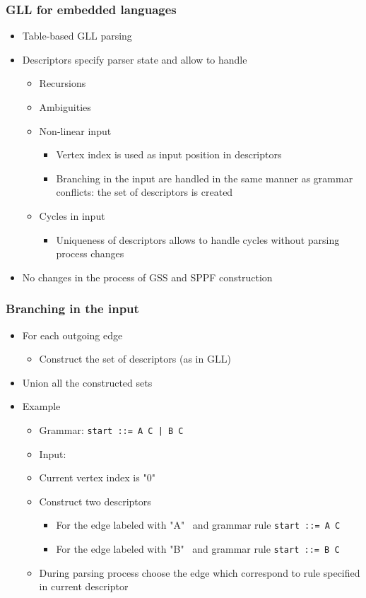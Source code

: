 \documentclass{beamer}
\begin{document}
\begin{frame}
  \transwipe[direction=90]
  \frametitle{GLL for embedded languages}  
  \begin{itemize}
    \item Table-based GLL parsing
    \item Descriptors specify parser state and allow to handle    
  \begin{itemize}
    \item Recursions
    \item Ambiguities
    \item Non-linear input
      \begin{itemize}
        \item Vertex index is used as input position in descriptors
        \item Branching in the input are handled in the same manner as grammar conflicts: the set of descriptors is created
      \end{itemize}
    \item Cycles in input
      \begin{itemize}
        \item Uniqueness of descriptors allows to handle cycles without parsing process changes
      \end{itemize}
    \end{itemize}
    \item  No changes in the process of GSS and SPPF construction
  \end{itemize}
\end{frame}

\begin{frame}
  \transwipe[direction=90]
  \frametitle{Branching in the input}
  \begin{itemize}
    \item For each outgoing edge
    \begin{itemize}
      \item Construct the set of descriptors (as in GLL)
    \end{itemize}
    \item Union all the constructed sets
    \item Example
    \begin{itemize}
      \item Grammar: \texttt{start ::= A C | B C}
      \item Input:
      \item Current vertex index is "0"
      \item Construct two descriptors
      \begin{itemize}
          \item For the edge labeled with "A" \ and grammar rule \texttt{start ::= A C}
          \item For the edge labeled with "B" \ and grammar rule \texttt{start ::= B C}
      \end{itemize}
      \item During parsing process choose the edge which correspond to rule specified in current descriptor 
    \end{itemize} 
  \end{itemize}
\end{frame}
\end{document}
